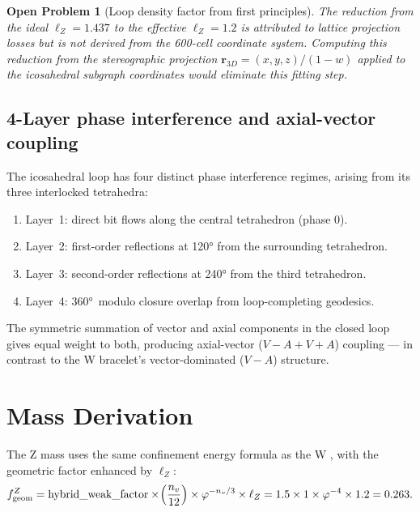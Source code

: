 \documentclass[11pt,letterpaper]{article}
\newtheorem{openprob}[theorem]{Open Problem}
\newcommand{\phig}{\varphi}
\begin{document}
\begin{openprob}[Loop density factor from first principles]
\label{op:loopfactor}
The reduction from the ideal $\ell_Z = 1.437$ to the effective
$\ell_Z = 1.2$ is attributed to lattice projection losses but is not
derived from the 600-cell coordinate system.  Computing this reduction
from the stereographic projection $\mathbf{r}_{3D} = (x,y,z)/(1-w)$
applied to the icosahedral subgraph coordinates would eliminate this
fitting step.
\end{openprob}

\subsection{4-Layer phase interference and axial-vector coupling}

The icosahedral loop has four distinct phase interference regimes,
arising from its three interlocked tetrahedra:
\begin{enumerate}
\item Layer~1: direct bit flows along the central tetrahedron (phase 0).
\item Layer~2: first-order reflections at 120° from the surrounding tetrahedron.
\item Layer~3: second-order reflections at 240° from the third tetrahedron.
\item Layer~4: 360°~modulo closure overlap from loop-completing geodesics.
\end{enumerate}
The symmetric summation of vector and axial components in the closed
loop gives equal weight to both, producing axial-vector ($V-A+V+A$)
coupling --- in contrast to the W bracelet's vector-dominated ($V-A$)
structure.

\section{Mass Derivation}

The Z mass uses the same confinement energy formula as the W
\cite{cpp_ew2}, with the geometric factor enhanced by $\ell_Z$:
\begin{equation}
f_{\rm geom}^Z
= \text{hybrid\_weak\_factor}
  \times\!\left(\frac{n_v}{12}\right)
  \times \phig^{-n_v/3}
  \times \ell_Z
= 1.5\times 1\times\phig^{-4}\times 1.2
= 0.263.
\label{eq:fgeom_z}
\end{equation}
\end{document}
